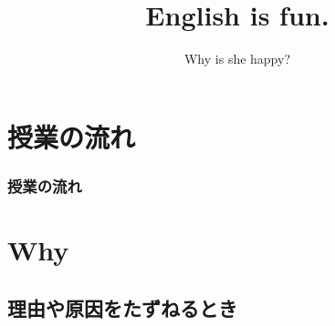 \documentclass[aspectratio=169,xcolor={dvipsnames,table}]{beamer}
\title{English is fun.}
\subtitle{Why is she happy?}
\author{}
\institute[]{}
\date[]
\begin{document}
\begin{frame}[plain]
  \titlepage
\end{frame}

\section*{授業の流れ}
\begin{frame}[plain]
  \frametitle{授業の流れ}
  \tableofcontents
\end{frame}

\section{Why }
\subsection{理由や原因をたずねるとき}
\end{document}
